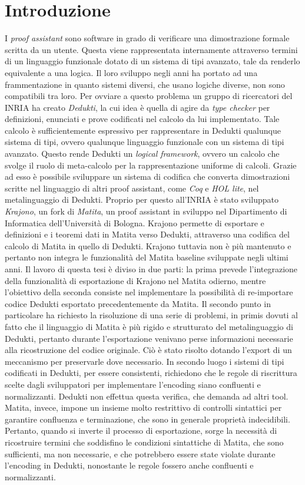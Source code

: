 \documentclass[12pt,a4paper]{report}
\begin{document}
\chapter*{Introduzione}
I \textit{proof assistant} sono software in grado di verificare una dimostrazione
formale scritta da un utente. Questa viene rappresentata internamente attraverso 
termini di un linguaggio funzionale dotato di un sistema di tipi avanzato, tale
da renderlo equivalente a una logica. Il loro sviluppo negli anni ha portato ad una frammentazione
in quanto sistemi diversi, che usano logiche diverse, non sono compatibili tra 
loro. Per ovviare a questo problema un gruppo di ricercatori del INRIA ha creato
\textit{Dedukti}, la cui idea è quella di agire da \textit{type checker} per definizioni, enunciati e prove codificati
nel calcolo da lui implementato. Tale calcolo è sufficientemente espressivo 
per rappresentare in Dedukti qualunque sistema di tipi, ovvero qualunque linguaggio
funzionale con un sistema di tipi avanzato. Questo rende Dedukti un \textit{logical 
framework}, ovvero un calcolo che svolge il ruolo di meta-calcolo per la rappresentazione
uniforme di calcoli. Grazie ad esso è possibile sviluppare un sistema di codifica che
converta dimostrazioni scritte nel linguaggio di altri proof assistant, come \textit{Coq} e \textit{HOL lite},
nel metalinguaggio di Dedukti. Proprio per questo all'INRIA è stato sviluppato \textit{Krajono}, un
fork di \textit{Matita}, un proof assistant in sviluppo nel Dipartimento 
di Informatica dell'Università di Bologna. Krajono permette di esportare e definizioni
e i teoremi dati in Matita verso Dedukti, attraverso una codifica del calcolo
di Matita in quello di Dedukti. Krajono tuttavia non è più mantenuto e pertanto non integra
le funzionalità del Matita baseline sviluppate negli ultimi anni. 
Il lavoro di questa tesi è diviso in due parti: la prima prevede l'integrazione della 
funzionalità di esportazione di Krajono nel Matita odierno, mentre l'obiettivo della seconda
consiste nel implementare la possibilità di re-importare
codice Dedukti esportato precedentemente da Matita. Il secondo punto in particolare 
ha richiesto la risoluzione di una serie di problemi, in primis dovuti al fatto che
il linguaggio di Matita è più rigido e strutturato del metalinguaggio di Dedukti,
pertanto durante l'esportazione venivano perse informazioni necessarie alla
ricostruzione del codice originale. Ciò è stato risolto dotando l'export di
un meccanismo per preservarle dove necessario. In secondo luogo i sistemi di tipi
codificati in Dedukti, per essere consistenti, richiedono che le regole di riscrittura
scelte dagli sviluppatori per implementare l'encoding siano confluenti e normalizzanti.
Dedukti non effettua questa verifica, che demanda ad altri tool. Matita, invece, impone
un insieme molto restrittivo di controlli sintattici per garantire confluenza e terminazione,
che sono in generale proprietà indecidibili. Pertanto, quando si inverte il processo di
esportazione, sorge la necessità di ricostruire termini che soddisfino le condizioni 
sintattiche di Matita, che sono sufficienti, ma non necessarie, e che potrebbero essere
state violate durante l'encoding in Dedukti, nonostante le regole fossero anche confluenti
e normalizzanti.
\end{document}
